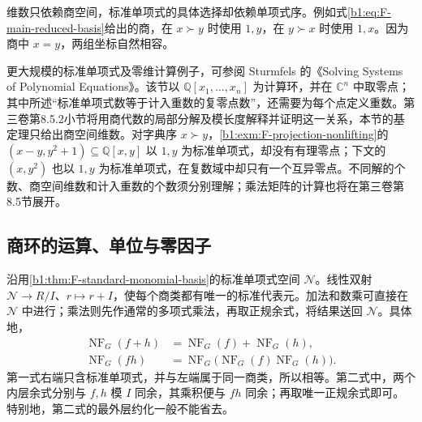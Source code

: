 \ProseParagraphBreak
维数只依赖商空间，标准单项式的具体选择却依赖单项式序。例如式\eqref{b1:eq:F-main-reduced-basis}给出的商，在 \(x\succ y\) 时使用 \(1,y\)，在 \(y\succ x\) 时使用 \(1,x\)。因为商中 \(x=y\)，两组坐标自然相容。

\ProseParagraphBreak
更大规模的标准单项式及零维计算例子，可参阅 Sturmfels 的《Solving Systems of Polynomial Equations》\cite[Section 2.1, Proposition 2.1]{Sturmfels2002PolynomialEquations}。该节以 \(\mathbb Q[x_1,\ldots,x_n]\) 为计算环，并在 \(\mathbb C^n\) 中取零点；其中所述“标准单项式数等于计入重数的复零点数”，还需要为每个点定义重数。第三卷第8.5.2小节将用商代数的局部分解及模长度解释并证明这一关系，本节的基定理只给出商空间维数。对字典序 \(x\succ y\)，\cref{b1:exm:F-projection-nonlifting}的 \((x-y,y^2+1)\subseteq\mathbb Q[x,y]\) 以 \(1,y\) 为标准单项式，却没有有理零点；下文的 \((x,y^2)\) 也以 \(1,y\) 为标准单项式，在复数域中却只有一个互异零点。不同解的个数、商空间维数和计入重数的个数须分别理解；乘法矩阵的计算也将在第三卷第8.5节展开。

\subsection{商环的运算、单位与零因子}
\label{b1:subsec:F05:02}

沿用\cref{b1:thm:F-standard-monomial-basis}的标准单项式空间 \(\mathcal N\)。线性双射 \(\mathcal N\to R/I\)、\(r\mapsto r+I\)，使每个商类都有唯一的标准代表元。加法和数乘可直接在 \(\mathcal N\) 中进行；乘法则先作通常的多项式乘法，再取正规余式，将结果送回 \(\mathcal N\)。具体地，
\begin{equation}\label{b1:eq:F-normal-arithmetic}
	\begin{aligned}
		\operatorname{NF}_G(f+h)&=\operatorname{NF}_G(f)+\operatorname{NF}_G(h),\\
		\operatorname{NF}_G(fh)&= \operatorname{NF}_G\bigl(\operatorname{NF}_G(f)\operatorname{NF}_G(h)\bigr).
	\end{aligned}
\end{equation}
第一式右端只含标准单项式，并与左端属于同一商类，所以相等。第二式中，两个内层余式分别与 \(f,h\) 模 \(I\) 同余，其乘积便与 \(fh\) 同余；再取唯一正规余式即可。特别地，第二式的最外层约化一般不能省去。

